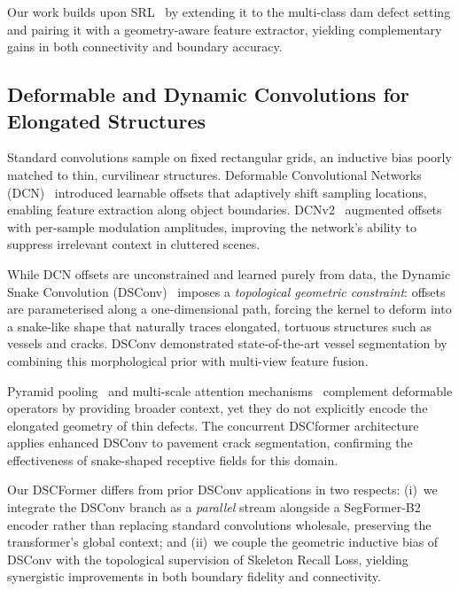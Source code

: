 Our work builds upon SRL~\cite{shit2024skeleton} by extending it to the multi-class dam defect setting and pairing it with a geometry-aware feature extractor, yielding complementary gains in both connectivity and boundary accuracy.

\subsection{Deformable and Dynamic Convolutions for Elongated Structures}
\label{sec:related:deformable}

Standard convolutions sample on fixed rectangular grids, an inductive bias poorly matched to thin, curvilinear structures.
Deformable Convolutional Networks (DCN)~\cite{dai2017deformable} introduced learnable offsets that adaptively shift sampling locations, enabling feature extraction along object boundaries.
DCNv2~\cite{zhu2019deformable} augmented offsets with per-sample modulation amplitudes, improving the network's ability to suppress irrelevant context in cluttered scenes.

While DCN offsets are unconstrained and learned purely from data, the Dynamic Snake Convolution (DSConv)~\cite{qi2023dynamic} imposes a \emph{topological geometric constraint}: offsets are parameterised along a one-dimensional path, forcing the kernel to deform into a snake-like shape that naturally traces elongated, tortuous structures such as vessels and cracks.
DSConv demonstrated state-of-the-art vessel segmentation by combining this morphological prior with multi-view feature fusion.

Pyramid pooling~\cite{zhao2017pspnet} and multi-scale attention mechanisms~\cite{liu2021swin} complement deformable operators by providing broader context, yet they do not explicitly encode the elongated geometry of thin defects.
The concurrent DSCformer architecture applies enhanced DSConv to pavement crack segmentation, confirming the effectiveness of snake-shaped receptive fields for this domain.

Our DSCFormer differs from prior DSConv applications in two respects: (i)~we integrate the DSConv branch as a \emph{parallel} stream alongside a SegFormer-B2 encoder rather than replacing standard convolutions wholesale, preserving the transformer's global context; and (ii)~we couple the geometric inductive bias of DSConv with the topological supervision of Skeleton Recall Loss, yielding synergistic improvements in both boundary fidelity and connectivity.
